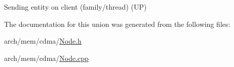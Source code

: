Sending entity on client (family/thread) (U\+P) 



The documentation for this union was generated from the following files\+:\begin{DoxyCompactItemize}
\item 
arch/mem/cdma/\hyperlink{cdma_2_node_8h}{Node.\+h}\item 
arch/mem/cdma/\hyperlink{cdma_2_node_8cpp}{Node.\+cpp}\end{DoxyCompactItemize}

